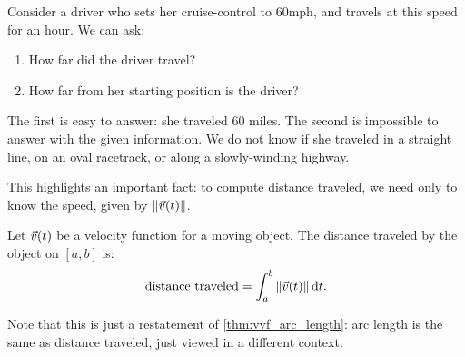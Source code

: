 Consider a driver who sets her cruise-control to 60mph, and travels at this speed for an hour. We can ask:
\begin{enumerate}
	\item How far did the driver travel?
	\item	How far from her starting position is the driver?
\end{enumerate} 
The first is easy to answer: she traveled 60 miles. The second is impossible to answer with the given information. We do not know if she traveled in a straight line, on an oval racetrack, or along a slowly-winding highway.

This highlights an important fact: to compute distance traveled, we need only to know the speed, given by $\left\lVert \vec v(t) \right\rVert$.

\begin{theorem}\label{thm:distance_traveled}%
Let $\vec v(t)$ be a velocity function for a moving object. The distance traveled by the object on $[a,b]$ is:
\[\text{distance traveled} = \int_a^b \left\lVert \vec v(t) \right\rVert\operatorname{d}\! t.\]
\end{theorem}

Note that this is just a restatement of \autoref{thm:vvf_arc_length}: arc length is the same as distance traveled, just viewed in a different context.


